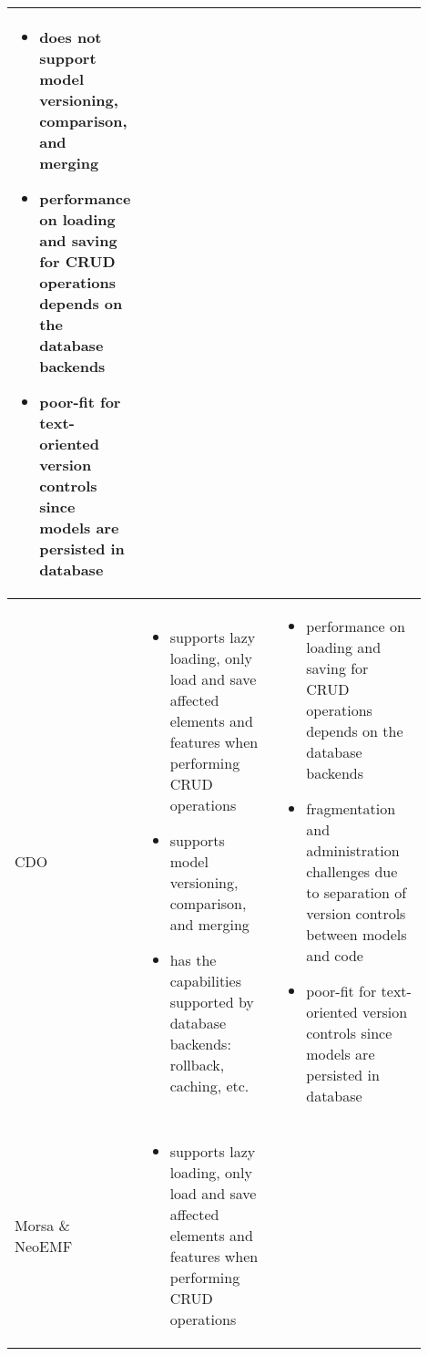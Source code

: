\begin{table*}[]
\begin{scriptsize}
\begin{tabular}{
      |>{\centering\arraybackslash}m{0.1\linewidth}
      |>{\centering\arraybackslash}m{0.4\linewidth}
      |>{\centering\arraybackslash}m{0.4\linewidth}
      |}
\begin{minipage}[t]{\linewidth}
      \raggedright
      \begin{itemize}[leftmargin=7pt]
        \setlength
        \item[--] does not support model versioning, comparison, and merging
        \item[--] performance on loading and saving for CRUD operations depends on the database backends
        \item[--] poor-fit for text-oriented version controls since models are persisted in database
      \end{itemize}
    \end{minipage} 
    \\
    \hline
    CDO
    &
    \begin{minipage}[t]{\linewidth}
      \raggedright
      \begin{itemize}[leftmargin=7pt]
        \setlength
        \item[+] supports lazy loading, only load and save affected elements and features when performing CRUD operations
        \item[+] supports model versioning, comparison, and merging
        \item[+] has the capabilities supported by database backends: rollback, caching, etc. 
      \end{itemize}
    \end{minipage}
    &
    \begin{minipage}[t]{\linewidth}
      \raggedright
      \begin{itemize}[leftmargin=7pt]
        \setlength
        \item[--] performance on loading and saving for CRUD operations depends on the database backends
        \item[--] fragmentation and administration challenges due to separation of version controls between models and code
        \item[--] poor-fit for text-oriented version controls since models are persisted in database
      \end{itemize}
    \end{minipage} 
    \\
    \hline
    Morsa \& NeoEMF 
    & 
    \begin{minipage}[t]{\linewidth}
      \raggedright
      \begin{itemize}[leftmargin=7pt]
        \setlength
        \item[+] supports lazy loading, only load and save affected elements and features when performing CRUD operations

\end{itemize}
\end{minipage}
\end{tabular}
\end{scriptsize}
\end{table*}
